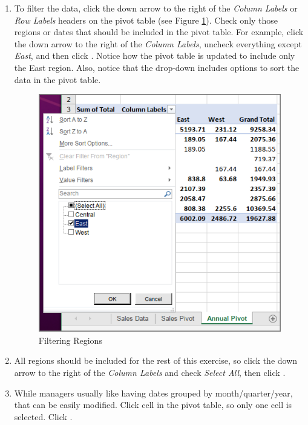 \begin{enumbox}
\begin{enumerate}
		\item To filter the data, click the down arrow to the right of the \textit{Column Labels} or \textit{Row Labels} headers on the pivot table (see Figure \ref{07:fig22}). Check only those regions or dates that should be included in the pivot table. For example, click the down arrow to the right of the \textit{Column Labels}, uncheck everything except \textit{East}, and then click . Notice how the pivot table is updated to include only the East region. Also, notice that the drop-down includes options to sort the data in the pivot table.

		\begin{figure}[H]
			\centering
			\includegraphics[width=\maxwidth{.95\linewidth}]{gfx/ch07_fig22}
			\caption{Filtering Regions}
			\label{07:fig22}
		\end{figure}

		\item All regions should be included for the rest of this exercise, so click the down arrow to the right of the \textit{Column Labels} and check \textit{Select All}, then click .
		\item While managers usually like having dates grouped by month/quarter/year, that can be easily modified. Click cell  in the pivot table, so only one cell is selected. Click .


\end{enumerate}
\end{enumbox}

